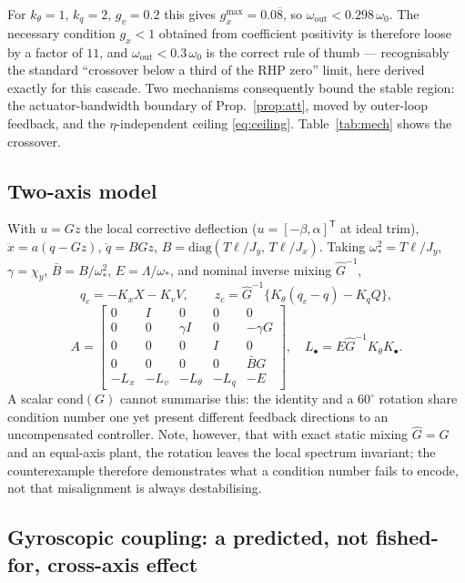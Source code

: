 \documentclass[11pt,a4paper]{article}
\begin{document}
For $k_\theta=1$, $k_q=2$, $g_v=0.2$ this gives $g_x^{\max}=0.0\overline{8}$, so
$\omega_{\text{out}}<0.298\,\omega_0$. The necessary condition $g_x<1$ obtained from coefficient
positivity is therefore loose by a factor of $11$, and $\omega_{\text{out}}<0.3\,\omega_0$ is the
correct rule of thumb --- recognisably the standard ``crossover below a third of the RHP zero''
limit, here derived exactly for this cascade. Two mechanisms consequently bound the stable region:
the actuator-bandwidth boundary of Prop.~\ref{prop:att}, moved by outer-loop feedback, and the
$\eta$-independent ceiling \eqref{eq:ceiling}. Table~\ref{tab:mech} shows the crossover.

\subsection{Two-axis model}

With $u=Gz$ the local corrective deflection ($u=[-\beta,\alpha]^{\mathsf T}$ at ideal trim),
$\ddot x = a(q-Gz)$, $\ddot q = BGz$, $B=\mathrm{diag}(T\ell/J_y,\,T\ell/J_x)$. Taking
$\omega_*^2=T\ell/J_y$, $\gamma=\chi_y$, $\bar B=B/\omega_*^2$, $E=\Lambda/\omega_*$, and nominal
inverse mixing $\widehat G^{-1}$,
\begin{equation}
q_c=-K_xX-K_vV,\qquad z_c=\widehat G^{-1}\{K_\theta(q_c-q)-K_qQ\},
\end{equation}
\begin{equation}
A=\begin{bmatrix}
0&I&0&0&0\\ 0&0&\gamma I&0&-\gamma G\\ 0&0&0&I&0\\ 0&0&0&0&\bar BG\\
-L_x&-L_v&-L_\theta&-L_q&-E\end{bmatrix},\quad
L_\bullet = E\widehat G^{-1}K_\theta K_\bullet .
\end{equation}
A scalar $\mathrm{cond}(G)$ cannot summarise this: the identity and a $60^\circ$ rotation share
condition number one yet present different feedback directions to an uncompensated controller. Note,
however, that with exact static mixing $\widehat G=G$ and an equal-axis plant, the rotation leaves
the local spectrum invariant; the counterexample therefore demonstrates what a condition number fails
to encode, not that misalignment is always destabilising.

\subsection{Gyroscopic coupling: a predicted, not fished-for, cross-axis effect}\label{sec:gyro}
\end{document}
